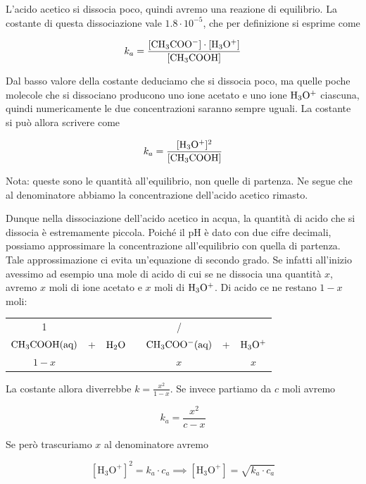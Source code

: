 L'acido acetico si dissocia poco, quindi avremo una reazione di equilibrio. La costante di questa dissociazione vale $1.8 \cdot 10^{-5}$, che per definizione si esprime come

$$k_a=\frac{\rm{[CH_3COO^-]} \cdot \rm{[H_3O^+]}}{\rm{[CH_3COOH]}}$$

Dal basso valore della costante deduciamo che si dissocia poco, ma quelle poche molecole che si dissociano producono uno ione acetato e uno ione $\rm H_3O^+$ ciascuna, quindi numericamente le due concentrazioni saranno sempre uguali. La costante si può allora scrivere come

$$k_a=\frac{\rm{[H_3O^+]^2}}{\rm{[CH_3COOH]}}$$

Nota: queste sono le quantità all'equilibrio, non quelle di partenza. Ne segue che al denominatore abbiamo la concentrazione dell'acido acetico rimasto.


 Dunque nella dissociazione dell'acido acetico in acqua, la quantità di acido che si dissocia è estremamente piccola. Poiché il pH è dato con due cifre decimali, possiamo approssimare la concentrazione all'equilibrio con quella di partenza. Tale approssimazione ci evita un'equazione di secondo grado. Se infatti all'inizio avessimo ad esempio una mole di acido di cui se ne dissocia una quantità $x$, avremo $x$ moli di ione acetato e $x$ moli di $\rm H_3O^+$. Di acido ce ne restano $1-x$ moli:

\begin{center}
    \begin{tabular}{ccccccc}
        1 &  &  & & / & &\\
        $\rm CH_3COOH(aq)$ & + & $\rm H_2O$ & \ce{<-->} & $\rm CH_3COO^-(aq)$ & + & $\rm H_3O^+$\\
        $1-x$ & & & & $x$ & & $x$\\
    \end{tabular}
\end{center}

La costante allora diverrebbe $\displaystyle k=\frac{x^2}{1-x}$. Se invece partiamo da $c$ moli avremo

$$k_a = \frac{x^2}{c-x}$$%

Se però trascuriamo $x$ al denominatore avremo

$$[\text{H}_3\text{O}^+]^2= k_a \cdot c_a \implies [\text{H}_3\text{O}^+] = \sqrt{k_a \cdot c_a}$$

